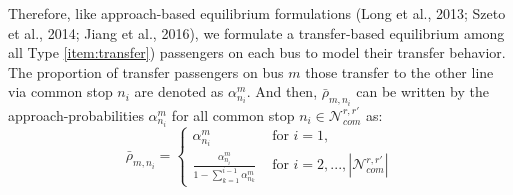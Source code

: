 \documentclass[smallextended]{svjour3}       %
\begin{document}
\begin{Abstract}
Therefore, like approach-based equilibrium formulations \textrm{(Long et al., 2013; Szeto et al., 2014; Jiang et al., 2016)}, 
we formulate a transfer-based equilibrium among all Type \ref{item:transfer}) passengers on each bus to model their transfer behavior.
The proportion of transfer passengers on bus $m$ 
those transfer to the other line via common stop $n_{i}$ 
are denoted as $\alpha_{n_{i}}^{m}$. 
And then, $\bar{\rho}_{m,n_{i}}$ can be written by the approach-probabilities $\alpha_{n_{i}}^{m}$ for all common stop $n_{i}\in\mathcal{N}_{com}^{r,r'}$ as:
\begin{equation}
    \bar{\rho}_{m,n_{i}} =
    \begin{cases}
        \alpha_{n_{i}}^{m}&\text{ for } i=1,\\
        \frac{\alpha_{n_{i}}^{m}}{1-\sum\limits_{k=1}^{i-1} \alpha_{n_{k}}^{m}}&\text{ for }i=2,...,\left|\mathcal{N}_{com}^{r,r'}\right|
    \end{cases} 
\end{equation}


\end{Abstract}
\end{document}
